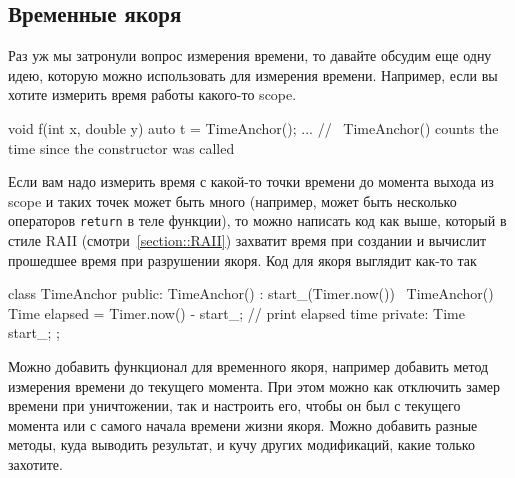 \subsection{Временные якоря}

Раз уж мы затронули вопрос измерения времени, то давайте обсудим еще одну идею, которую можно использовать для измерения времени.
Например, если вы хотите измерить время работы какого-то scope.
\begin{cppcode}
void f(int x, double y) {
  auto t = TimeAnchor();
  ...
} // ~TimeAnchor() counts the time since the constructor was called
\end{cppcode}
Если вам надо измерить время с какой-то точки времени до момента выхода из scope и таких точек может быть много (например, может быть несколько операторов \verb"return" в теле функции), то можно написать код как выше, который в стиле RAII (смотри~\ref{section::RAII}) захватит время при создании и вычислит прошедшее время при разрушении якоря.
Код для якоря выглядит как-то так
\begin{cppcode}
class TimeAnchor {
public:
  TimeAnchor() : start_(Timer.now()) {}
  ~TimeAnchor() {
    Time elapsed = Timer.now() - start_;
    // print elapsed time
  }
private:
  Time start_;
};
\end{cppcode}
Можно добавить функционал для временного якоря, например добавить метод измерения времени до текущего момента.
При этом можно как отключить замер времени при уничтожении, так и настроить его, чтобы он был с текущего момента или с самого начала времени жизни якоря.
Можно добавить разные методы, куда выводить результат, и кучу других модификаций, какие только захотите.
